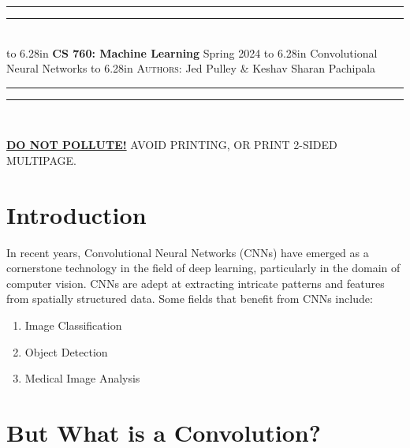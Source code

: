 \documentclass{article}
\newcommand{\lecture}[2]{
\pagestyle{myheadings}
\thispagestyle{plain}
\newpage
\noindent
\begin{center}
\rule{\textwidth}{1.6pt}\vspace*{-\baselineskip}\vspace*{2pt} %
\rule{\textwidth}{0.4pt}\\[1\baselineskip] %
\vbox{\vspace{2mm}
\hbox to 6.28in { {\bf CS 760: Machine Learning} \hfill Spring 2024 }
\vspace{4mm}
\hbox to 6.28in { {\Large \hfill #1  \hfill} }
\vspace{4mm}
\hbox to 6.28in { {\scshape Authors:}  #2 \hfill }}
\vspace{-2mm}
\rule{\textwidth}{0.4pt}\vspace*{-\baselineskip}\vspace{3.2pt} %
\rule{\textwidth}{1.6pt}\\[\baselineskip] %
\end{center}
\vspace*{4mm}
}
\begin{document}
\lecture{Convolutional Neural Networks}{Jed Pulley \& Keshav Sharan Pachipala}

\begin{center}
{\Large {\sf \underline{\textbf{DO NOT POLLUTE!}} AVOID PRINTING, OR PRINT 2-SIDED MULTIPAGE.}}
\end{center}


\section{Introduction}
    In recent years, Convolutional Neural Networks (CNNs) have emerged as a cornerstone technology in the field of deep learning, particularly in the domain of computer vision. CNNs are adept at extracting intricate patterns and features from spatially structured data. Some fields that benefit from CNNs include:
        \begin{enumerate}
            \item Image Classification
            \item Object Detection
            \item Medical Image Analysis
        \end{enumerate}

\section{But What is a Convolution?}
\end{document}
